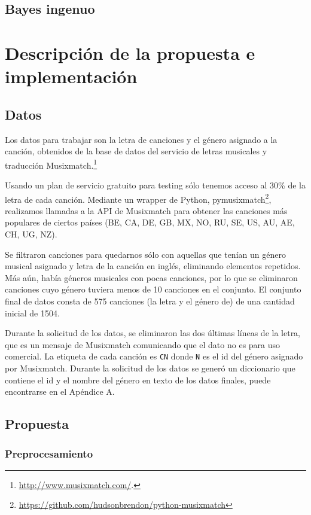 \documentclass[spanish,11pt,letterpaper]{article}
\begin{document}
\subsection{Bayes ingenuo}

\section{Descripción de la propuesta e implementación}

\subsection{Datos}

Los datos para trabajar son la letra de canciones y el género asignado a la canción,
obtenidos de la base de datos del servicio de letras musicales y traducción
Musixmatch.\footnote{\url{http://www.musixmatch.com/}.}

Usando un plan de servicio gratuito para testing sólo tenemos acceso al 30\% de
la letra de cada canción. Mediante un wrapper de Python,
pymusixmatch\footnote{\url{https://github.com/hudsonbrendon/python-musixmatch}},
realizamos llamadas a la API de Musixmatch para obtener las canciones más populares
de ciertos países (BE, CA, DE, GB, MX, NO, RU, SE, US, AU, AE, CH, UG, NZ).

Se filtraron canciones para quedarnos sólo con aquellas que tenían un género musical
asignado y letra de la canción en inglés, eliminando elementos repetidos.
Más aún, había géneros musicales con pocas canciones, por lo que se eliminaron
canciones cuyo género tuviera menos de 10 canciones en el conjunto. El conjunto final
de datos consta de 575 canciones (la letra y el género de) de una cantidad
inicial de 1504.

Durante la solicitud de los datos, se eliminaron las dos últimas líneas de la letra, que
es un mensaje de Musixmatch comunicando que el dato no es para uso comercial.
La etiqueta de cada canción es \texttt{CN} donde \texttt{N} es el id del género
asignado por Musixmatch. Durante la solicitud de los datos se generó un diccionario
que contiene el id y el nombre del género en texto de los datos finales,
puede encontrarse en el Apéndice A.

\subsection{Propuesta}

\subsubsection{Preprocesamiento}
\end{document}
